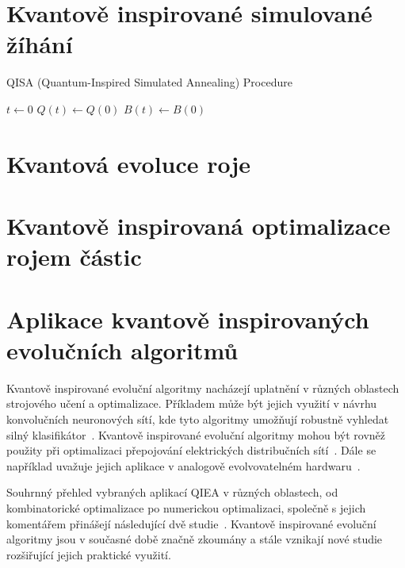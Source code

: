 \section{Kvantově inspirované simulované žíhání}

\begin{algorithm}
    \caption{QISA (Quantum-Inspired Simulated Annealing) Procedure}
    $t \gets 0$\;
    $Q(t) \gets Q(0)$\;
    $B(t) \gets B(0)$\;
    \;
\end{algorithm}

\section{Kvantová evoluce roje}

\section{Kvantově inspirovaná optimalizace rojem částic}

\section{Aplikace kvantově inspirovaných evolučních algoritmů}
Kvantově inspirované evoluční algoritmy nacházejí uplatnění v různých oblastech strojového učení a optimalizace. 
Příkladem může být jejich využití v návrhu konvolučních neuronových sítí, kde tyto algoritmy umožňují robustně vyhledat silný klasifikátor~\cite{QIEA-CNN}. 
Kvantově inspirované evoluční algoritmy mohou být rovněž použity při optimalizaci přepojování elektrických distribučních sítí~\cite{QIEA-net}. 
Dále se například uvažuje jejich aplikace v analogově evolvovatelném hardwaru~\cite{QIEA-EHW}. 

Souhrnný přehled vybraných aplikací QIEA v různých oblastech, od kombinatorické optimalizace po numerickou optimalizaci, společně s jejich komentářem přinášejí následující dvě studie~\cite{QIEA-survey1, QIEA-survey2}. 
Kvantově inspirované evoluční algoritmy jsou v současné době značně zkoumány a stále vznikají nové studie rozšiřující jejich praktické využití. 
